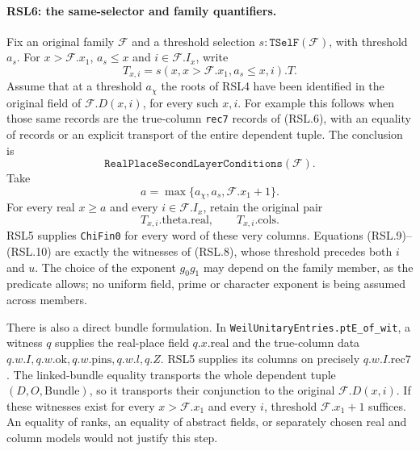 \paragraph{RSL6: the same-selector and family quantifiers.}
\label{claim:RSL6}
Fix an original family $\mathcal F$ and a threshold selection
$s:\texttt{TSelF}(\mathcal F)$, with threshold $a_s$.
For $x>\mathcal F.x_1$, $a_s\le x$ and $i\in\mathcal F.I_x$,
write
\[
       T_{x,i}=s(x,x>\mathcal F.x_1,a_s\le x,i).T.
\]
Assume that at a threshold $a_\chi$ the roots of RSL4 have been
identified in the original field of $\mathcal F.D(x,i)$, for
every such $x,i$.  For example this follows when those same
records are the true-column \texttt{rec7} records of (RSL.6),
with an equality of records or an explicit transport of the
entire dependent tuple.  The conclusion is
\[
             \texttt{RealPlaceSecondLayerConditions}(\mathcal F).
                                                                  \tag{RSL.8}
\]
Take
\[
             a=\max\{a_\chi,a_s,\mathcal F.x_1+1\}.
                                                                  \tag{RSL.9}
\]
For every real $x\ge a$ and every $i\in\mathcal F.I_x$, retain
the original pair
\[
       T_{x,i}.\mathrm{theta}.\mathrm{real},\qquad
       T_{x,i}.\mathrm{cols}.
                                                                  \tag{RSL.10}
\]
RSL5 supplies \texttt{ChiFin0} for every word of these very
columns.  Equations (RSL.9)--(RSL.10) are exactly the witnesses
of (RSL.8), whose threshold precedes both $i$ and $u$.
The choice of the exponent $g_0g_1$ may depend on the family
member, as the predicate allows; no uniform field, prime or
character exponent is being assumed across members.

There is also a direct bundle formulation.  In
\texttt{WeilUnitaryEntries.ptE\_of\_wit}, a witness $q$ supplies
the real-place field $q.x.\mathrm{real}$ and the true-column
data $q.w.I,q.w.\mathrm{ok},q.w.\mathrm{pins},q.w.l,q.Z$.
RSL5 supplies its columns on precisely $q.w.I.\mathrm{rec7}$.
The linked-bundle equality transports the whole dependent tuple
$(D,O,\mathrm{Bundle})$, so it transports their conjunction to
the original $\mathcal F.D(x,i)$.  If these witnesses exist for
every $x>\mathcal F.x_1$ and every $i$, threshold
$\mathcal F.x_1+1$ suffices.  An equality of ranks, an equality
of abstract fields, or separately chosen real and column models
would not justify this step.

